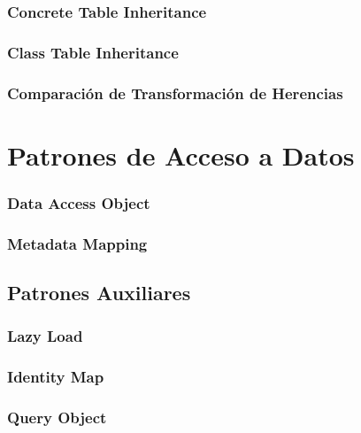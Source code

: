 \documentclass[a4paper,slidestop,xcolor=pst,blue]{beamer}
\begin{document}
\subsubsection{Concrete Table Inheritance}

\subsubsection{Class Table Inheritance}

\subsubsection{Comparación de Transformación de Herencias}

\section{Patrones de Acceso a Datos}

\subsubsection{Data Access Object}

\subsubsection{Metadata Mapping}

\subsection{Patrones Auxiliares}

\subsubsection{Lazy Load}

\subsubsection{Identity Map}

\subsubsection{Query Object}
\end{document}
